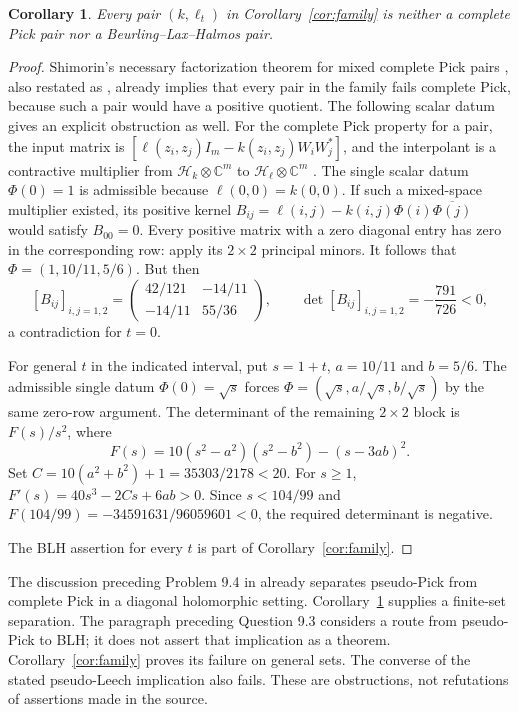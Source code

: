 \documentclass[11pt]{article}
\newtheorem{corollary}[theorem]{Corollary}
\newcommand{\HH}{\mathcal H}
\begin{document}
\begin{corollary}\label{cor:separation}
Every pair $(k,\ell_t)$ in Corollary~\ref{cor:family} is neither a
complete Pick pair nor a Beurling--Lax--Halmos pair.
\end{corollary}
\begin{proof}
Shimorin's necessary factorization theorem for mixed complete Pick pairs
\cite[Theorem 1.4]{Shimorin}, also restated as
\cite[Theorem 1.9]{MT}, already implies that every pair in the family
fails complete Pick, because such a pair would have a positive quotient.
The following scalar datum gives an explicit obstruction as well.
For the complete Pick property for a pair, the input matrix is
$[\ell(z_i,z_j)I_m-k(z_i,z_j)W_iW_j^*]$, and the interpolant is a
contractive multiplier from $\HH_k\otimes\mathbb C^m$ to
$\HH_\ell\otimes\mathbb C^m$ \cite[Definition 3.25]{LMT}.
The single scalar datum $\Phi(0)=1$ is admissible because
$\ell(0,0)=k(0,0)$. If such a mixed-space multiplier existed, its
positive kernel
$B_{ij}=\ell(i,j)-k(i,j)\Phi(i)\overline{\Phi(j)}$ would satisfy
$B_{00}=0$. Every positive matrix with a zero diagonal entry has zero
in the corresponding row: apply its $2\times2$ principal minors.
It follows that
$\Phi=(1,10/11,5/6)$. But then
\[
 [B_{ij}]_{i,j=1,2}=
 \begin{pmatrix}42/121&-14/11\\-14/11&55/36\end{pmatrix},
 \qquad \det[B_{ij}]_{i,j=1,2}=-\frac{791}{726}<0,
\]
a contradiction for $t=0$.

For general $t$ in the indicated interval, put $s=1+t$,
$a=10/11$ and $b=5/6$. The admissible single datum
$\Phi(0)=\sqrt{s}$ forces
$\Phi=(\sqrt{s},a/\sqrt{s},b/\sqrt{s})$ by the same zero-row argument.
The determinant of the remaining $2\times2$ block is $F(s)/s^2$, where
\[
 F(s)=10(s^2-a^2)(s^2-b^2)-(s-3ab)^2.
\]
Set $C=10(a^2+b^2)+1=35303/2178<20$.
For $s\geq1$, $F'(s)=40s^3-2Cs+6ab>0$.
Since $s<104/99$ and
$F(104/99)=-34591631/96059601<0$, the required determinant is negative.

The BLH assertion for every $t$ is part of Corollary~\ref{cor:family}.
\end{proof}

The discussion preceding Problem 9.4 in \cite[p.~45]{LMT} already
separates pseudo-Pick from complete Pick in a diagonal holomorphic
setting. Corollary~\ref{cor:separation} supplies a finite-set
separation. The paragraph preceding Question 9.3 considers a route from
pseudo-Pick to BLH; it does not assert that implication as a theorem.
Corollary~\ref{cor:family} proves its failure on general sets. The
converse of the stated pseudo-Leech implication also fails. These are
obstructions, not refutations of assertions made in the source.
\end{document}
